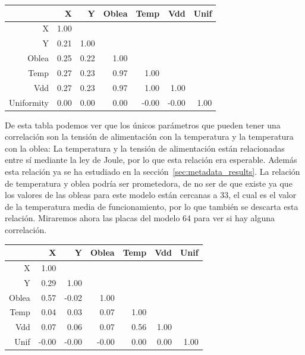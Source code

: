 \documentclass[spanish]{template/minim}
\begin{document}
\begin{table}[H]
    \centering
\begin{tabular}{r|rrrrrr}
  \hline
 & X & Y & Oblea & Temp & Vdd & Unif \\
  \hline
X & 1.00 & & & & & \\
  Y & 0.21 & 1.00 & & & &\\
  Oblea & 0.25 & 0.22 & 1.00 & & &  \\
  Temp & 0.27 & 0.23 & {\color{accent}0.97} & 1.00 & & \\
  Vdd & 0.27 & 0.23 & {\color{accent}0.97} & 1.00 & 1.00 & \\
  Uniformity & 0.00 & 0.00 & 0.00 & -0.00 & -0.00 & 1.00 \\
   \hline
\end{tabular}
\end{table}

De esta tabla podemos ver que los únicos parámetros que pueden tener una correlación son la tensión de alimentación con la temperatura y la temperatura con la oblea: La temperatura y la tensión de alimentación están relacionadas entre sí mediante la ley de Joule, por lo que esta relación era esperable. Además esta relación ya se ha estudiado en la sección~\ref{sec:metadata_results}. La relación de temperatura y oblea podría ser prometedora, de no ser de que existe ya que los valores de las obleas para este modelo están cercanas a 33, el cual es el valor de la temperatura media de funcionamiento, por lo que también se descarta esta relación. Miraremos ahora las placas del modelo 64 para ver si hay alguna correlación.

\begin{table}[H]
    \centering
\begin{tabular}{r|rrrrrr}
  \hline
 & X & Y & Oblea & Temp & Vdd & Unif \\
  \hline
X & 1.00 & & & & &  \\
  Y & 0.29 & 1.00 & & & &  \\
  Oblea & {\color{accent}0.57} & -0.02 & 1.00 & & & \\
  Temp & 0.04 & 0.03 & 0.07 & 1.00 & &  \\
  Vdd & 0.07 & 0.06 & 0.07 & {\color{accent}0.56} & 1.00 & \\
  Unif & -0.00 & -0.00 & -0.00 & 0.00 & 0.00 & 1.00 \\
   \hline
\end{tabular}
\end{table}
\end{document}
